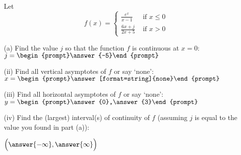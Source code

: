 \documentclass{ximera}
\begin{document}
\begin{exercise}

Let
\[
f(x)=
\begin{cases}
\frac{e^x}{x-1} & \text{ if } x\leq 0\\
\frac{6x+j}{2x+5} & \text{ if } x>0
\end{cases}
\]

(a) Find the value $j$ so that the function $f$ is continuous at $x=0$: $j=\begin{prompt}\answer{-5}\end{prompt}$

(ii) Find all vertical asymptotes of $f$ or say `none': $x=\begin{prompt}\answer[format=string]{none}\end{prompt}$

(iii) Find all horizontal asymptotes of $f$ or say `none': $y=\begin{prompt}\answer{0},\answer{3}\end{prompt}$

(iv) Find the (largest) interval(s) of continuity of $f$ (assuming $j$ is equal to the value you found in part (a)):
\begin{prompt}
$\Big(\answer{-\infty},\answer{\infty}\Big)$
\end{prompt}
\end{exercise}
\end{document}
